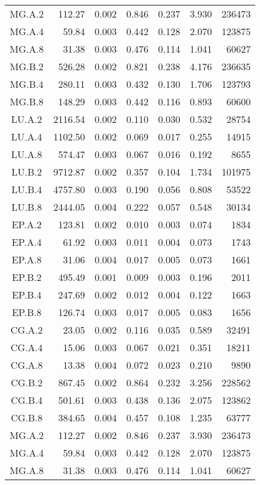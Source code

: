 \begin{longtable}[c]{c*{6}{r}}
MG.A.2 & 112.27 & 0.002 & 0.846 & 0.237 & 3.930 & 236473 \\
MG.A.4 & 59.84 & 0.003 & 0.442 & 0.128 & 2.070 & 123875 \\
MG.A.8 & 31.38 & 0.003 & 0.476 & 0.114 & 1.041 & 60627 \\
MG.B.2 & 526.28 & 0.002 & 0.821 & 0.238 & 4.176 & 236635 \\
MG.B.4 & 280.11 & 0.003 & 0.432 & 0.130 & 1.706 & 123793 \\
MG.B.8 & 148.29 & 0.003 & 0.442 & 0.116 & 0.893 & 60600 \\
LU.A.2 & 2116.54 & 0.002 & 0.110 & 0.030 & 0.532 & 28754 \\
LU.A.4 & 1102.50 & 0.002 & 0.069 & 0.017 & 0.255 & 14915 \\
LU.A.8 & 574.47 & 0.003 & 0.067 & 0.016 & 0.192 & 8655 \\
LU.B.2 & 9712.87 & 0.002 & 0.357 & 0.104 & 1.734 & 101975 \\
LU.B.4 & 4757.80 & 0.003 & 0.190 & 0.056 & 0.808 & 53522 \\
LU.B.8 & 2444.05 & 0.004 & 0.222 & 0.057 & 0.548 & 30134 \\
EP.A.2 & 123.81 & 0.002 & 0.010 & 0.003 & 0.074 & 1834 \\
EP.A.4 & 61.92 & 0.003 & 0.011 & 0.004 & 0.073 & 1743 \\
EP.A.8 & 31.06 & 0.004 & 0.017 & 0.005 & 0.073 & 1661 \\
EP.B.2 & 495.49 & 0.001 & 0.009 & 0.003 & 0.196 & 2011 \\
EP.B.4 & 247.69 & 0.002 & 0.012 & 0.004 & 0.122 & 1663 \\
EP.B.8 & 126.74 & 0.003 & 0.017 & 0.005 & 0.083 & 1656 \\
CG.A.2 & 23.05 & 0.002 & 0.116 & 0.035 & 0.589 & 32491 \\
CG.A.4 & 15.06 & 0.003 & 0.067 & 0.021 & 0.351 & 18211 \\
CG.A.8 & 13.38 & 0.004 & 0.072 & 0.023 & 0.210 & 9890 \\
CG.B.2 & 867.45 & 0.002 & 0.864 & 0.232 & 3.256 & 228562 \\
CG.B.4 & 501.61 & 0.003 & 0.438 & 0.136 & 2.075 & 123862 \\
CG.B.8 & 384.65 & 0.004 & 0.457 & 0.108 & 1.235 & 63777 \\
MG.A.2 & 112.27 & 0.002 & 0.846 & 0.237 & 3.930 & 236473 \\
MG.A.4 & 59.84 & 0.003 & 0.442 & 0.128 & 2.070 & 123875 \\
MG.A.8 & 31.38 & 0.003 & 0.476 & 0.114 & 1.041 & 60627 \\

\end{longtable}
